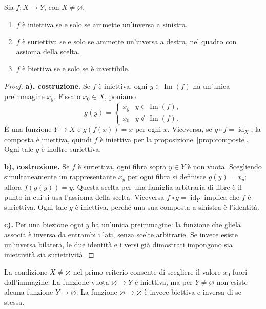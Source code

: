 \begin{teorema}\label{teo:inverse}
Sia $f:X\to Y$, con $X\ne\varnothing$.
\begin{enumerate}[label=\alph*)]
  \item $f$ è iniettiva se e solo se ammette un'inversa a sinistra.
  \item $f$ è suriettiva se e solo se ammette un'inversa a destra, nel quadro con assioma della scelta.
  \item $f$ è biettiva se e solo se è invertibile.
\end{enumerate}
\end{teorema}
\begin{proof}
\textbf{a), costruzione.} Se $f$ è iniettiva, ogni $y\in\operatorname{Im}(f)$ ha un'unica preimmagine $x_y$. Fissato $x_0\in X$, poniamo
\[
g(y)=\begin{cases}x_y&y\in\operatorname{Im}(f),\\x_0&y\notin\operatorname{Im}(f).\end{cases}
\]
È una funzione $Y\to X$ e $g(f(x))=x$ per ogni $x$. Viceversa, se $g\circ f=\operatorname{id}_X$, la composta è iniettiva, quindi $f$ è iniettiva per la proposizione~\ref{prop:composte}. Ogni tale $g$ è inoltre suriettiva.

\textbf{b), costruzione.} Se $f$ è suriettiva, ogni fibra sopra $y\in Y$ è non vuota. Scegliendo simultaneamente un rappresentante $x_y$ per ogni fibra si definisce $g(y)=x_y$; allora $f(g(y))=y$. Questa scelta per una famiglia arbitraria di fibre è il punto in cui si usa l'assioma della scelta. Viceversa $f\circ g=\operatorname{id}_Y$ implica che $f$ è suriettiva. Ogni tale $g$ è iniettiva, perché una sua composta a sinistra è l'identità.

\textbf{c).} Per una biezione ogni $y$ ha un'unica preimmagine: la funzione che gliela associa è inversa da entrambi i lati, senza scelte arbitrarie. Se invece esiste un'inversa bilatera, le due identità e i versi già dimostrati impongono sia iniettività sia suriettività.
\end{proof}

\begin{osservazione}
La condizione $X\ne\varnothing$ nel primo criterio consente di scegliere il valore $x_0$ fuori dall'immagine. La funzione vuota $\varnothing\to Y$ è iniettiva, ma per $Y\ne\varnothing$ non esiste alcuna funzione $Y\to\varnothing$. La funzione $\varnothing\to\varnothing$ è invece biettiva e inversa di se stessa.
\end{osservazione}

